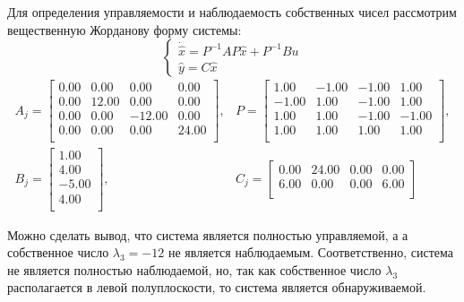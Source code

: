Для определения управляемости и наблюдаемость собственных чисел рассмотрим вещественную Жорданову форму системы:
\begin{equation}
    \begin{cases}
        \dot{\hat{x}} = P^{-1}AP\hat{x} + P^{-1}Bu \\
        \hat{y} = C\hat{x} 
    \end{cases}
\end{equation}
\begin{equation}
    \begin{array}{cccc}
        A_j = \begin{bmatrix}
            0.00  & 0.00  & 0.00  & 0.00 \\ 
            0.00  & 12.00  & 0.00  & 0.00 \\ 
            0.00  & 0.00  & -12.00  & 0.00 \\ 
            0.00  & 0.00  & 0.00  & 24.00 \\ 
            \end{bmatrix}, &
        P = \begin{bmatrix}
            1.00  & -1.00  & -1.00  & 1.00 \\ 
            -1.00  & 1.00  & -1.00  & 1.00 \\ 
            1.00  & 1.00  & -1.00  & -1.00 \\ 
            1.00  & 1.00  & 1.00  & 1.00 \\ 
            \end{bmatrix}, \\
        B_j = \begin{bmatrix}
            1.00 \\ 
            4.00 \\ 
            -5.00 \\ 
            4.00 \\ 
            \end{bmatrix}, & 
        C_j = \begin{bmatrix}
            0.00  & 24.00  & 0.00  & 0.00 \\ 
            6.00  & 0.00  & 0.00  & 6.00 \\ 
        \end{bmatrix}
    \end{array}
\end{equation}

Можно сделать вывод, что система является полностью управляемой, а 
а собственное число $\lambda_3 = -12$ не является наблюдаемым. Соответственно, 
система не является полностью наблюдаемой, но, так как собственное число 
$\lambda_3$ располагается в левой полуплоскости, то система является обнаруживаемой. 

